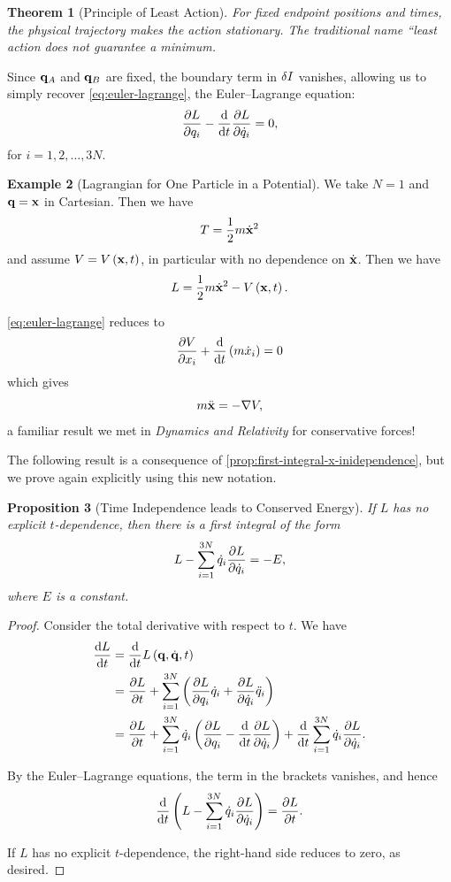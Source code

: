 \documentclass[11pt]{article}
\numberwithin{equation}{section}
\newtheorem{theorem}{Theorem}[section]
\newtheorem{proposition}[theorem]{Proposition}
\theoremstyle{definition}
\newtheorem{example}[theorem]{Example}
\theoremstyle{remark}
\newcommand{\pqty}[1]{\left(#1\right)}
\newcommand{\grad}{\nabla}
\begin{document}
\begin{theorem}[Principle of Least Action]\label{variation-unit-0059}
    For fixed endpoint positions and times, the physical trajectory makes the action stationary. The traditional name ``least action does not guarantee a minimum.
\end{theorem}

Since \(\vb{q}_A\) and \(\vb{q}_B\) are fixed, the boundary term in \(\var{I}\) vanishes, allowing us to simply recover \autoref{eq:euler-lagrange}, the Euler--Lagrange equation:
\[
    \pdv{L}{q_i} - \dv{t} \pdv{L}{\dot{q}_i} = 0,
\]
for \(i = 1, 2, \ldots, 3N\).

\begin{example}[Lagrangian for One Particle in a Potential]\label{variation-unit-0060}
    We take \(N = 1\) and \(\vb{q} = \vb{x}\) in Cartesian. Then we have
    \[
        T = \frac{1}{2} m \dot{\vb{x}}^2
    \]
    and assume \(V = V \pqty{\vb{x}, t}\), in particular with no dependence on \(\dot{\vb{x}}\). Then we have
    \[
        L = \frac{1}{2} m \dot{\vb{x}}^2 - V \pqty{\vb{x}, t}.
    \]

    \autoref{eq:euler-lagrange} reduces to
    \[
        \pdv{V}{x_i} + \dv{t} \pqty{m \dot{x}_i} = 0
    \]
    which gives
    \[
        m \ddot{\vb{x}} = - \grad V,
    \]
    a familiar result we met in \textit{Dynamics and Relativity} for conservative forces!
\end{example}

The following result is a consequence of \autoref{prop:first-integral-x-inidependence}, but we prove again explicitly using this new notation.

\begin{proposition}[Time Independence leads to Conserved Energy]\label{variation-unit-0061}
    \label{prop:time-independence-conserved-energy}%
    If \(L\) has no explicit \(t\)-dependence, then there is a first integral of the form
    \[
        L - \sum_{i = 1}^{3N} \dot{q}_i \pdv{L}{\dot{q}_i} = - E,
    \]
    where \(E\) is a constant.
\end{proposition}

\begin{proof}
    Consider the total derivative with respect to \(t\). We have
    \begin{align*}
        \dv{L}{t} &= \dv{t} L\pqty{\vb{q}, \dot{\vb{q}}, t} \\
        &= \pdv{L}{t} + \sum_{i = 1}^{3N} \pqty{\pdv{L}{q_i} \dot{q}_i + \pdv{L}{\dot{q}_i} \ddot{q}_i} \\
        &= \pdv{L}{t} + \sum_{i = 1}^{3N} \dot{q}_i \pqty{\pdv{L}{q_i} - \dv{t} \pdv{L}{\dot{q}_i}} + \dv{t} \sum_{i = 1}^{3N} \dot{q}_i \pdv{L}{\dot{q}_i}.
    \end{align*}

    By the Euler--Lagrange equations, the term in the brackets vanishes, and hence
    \[
        \dv{t} \pqty{L - \sum_{i = 1}^{3N} \dot{q}_i \pdv{L}{\dot{q}_i}} = \pdv{L}{t}.
    \]

    If \(L\) has no explicit \(t\)-dependence, the right-hand side reduces to zero, as desired.
\end{proof}
\end{document}
